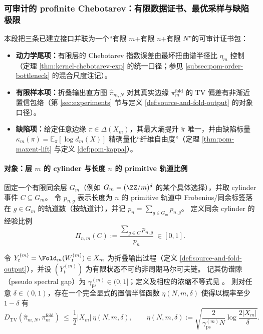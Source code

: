\subsubsection{可审计的 profinite Chebotarev：有限数据证书、最优采样与缺陷极限}\label{subsec:auditable-profinite-chebotarev}

本段把三条已建立接口并联为一个“有限 \(m\)+有限 \(n\)+有限 \(N\)”的可审计证书包：
\begin{itemize}
  \item \textbf{动力学尾项：}有限层的 Chebotarev 指数误差由最坏扭曲谱半径比 \(\eta_m\) 控制（定理 \ref{thm:kernel-chebotarev-exp} 的统一口径；参见 \ref{subsec:pom-order-bottleneck} 的混合尺度注记）。
  \item \textbf{有限样本项：}折叠输出直方图 \(\hat{\pi}_{m,N}\) 对其真实边缘 \(\pi_m^{\mathrm{fold}}\) 的 TV 偏差有非渐近置信包络（第 \ref{sec:experiments} 节与定义 \ref{def:source-and-fold-output} 的对象口径）。
  \item \textbf{缺陷项：}给定任意边缘 \(\pi\in\Delta(X_m)\)，其最大熵提升 \(\widetilde\pi\) 唯一，并由缺陷标量 \(\kappa_m(\pi)=\mathbb{E}_\pi[\log d_m(X)]\) 精确量化“纤维自由度”（定理 \ref{thm:pom-maxent-lift} 与定义 \ref{def:pom-kappa}）。
\end{itemize}

\paragraph{对象：层 \(m\) 的 cylinder 与长度 \(n\) 的 primitive 轨道比例}
固定一个有限同余层 \(G_m\)（例如 \(G_m=(\ZZ/m)^d\) 的某个具体选择），并取 cylinder 事件 \(C\subseteq G_m\)。
令 \(p_{n,g}\) 表示长度为 \(n\) 的 primitive 轨道中 Frobenius/同余标签落在 \(g\in G_m\) 的轨道数（按轨道计），并记 \(p_n=\sum_{g\in G_m}p_{n,g}\)。
定义同余 cylinder 的经验比例
\[
\Pi_{n,m}(C):=\frac{\sum_{g\in C}p_{n,g}}{p_n}\ \in[0,1].
\]

\begin{theorem}\label{thm:tv-envelope-markov}
令 \(Y_t^{(m)}=\Fold_m(W_t^{(m)})\in X_m\) 为折叠输出过程（定义 \ref{def:source-and-fold-output}），并设 \((Y_t^{(m)})\) 为有限状态不可约非周期马尔可夫链。
记其伪谱隙（pseudo spectral gap）为 \(\gamma_{\mathrm{ps}}^{(m)}\in(0,1]\)；定义及相应的浓缩不等式见 \cite{Paulin2015MarkovConcentration}。
则对任意 \(\delta\in(0,1)\)，存在一个完全显式的置信半径函数 \(\eta(N,m,\delta)\) 使得以概率至少 \(1-\delta\) 有
\[
D_{\mathrm{TV}}(\hat{\pi}_{m,N},\pi_m^{\mathrm{fold}})
\ \le\
\frac12|X_m|\,\eta(N,m,\delta),
\qquad
\eta(N,m,\delta)
:=\sqrt{\frac{2}{\gamma_{\mathrm{ps}}^{(m)}N}\log\frac{2|X_m|}{\delta}}.
\]
\end{theorem}

